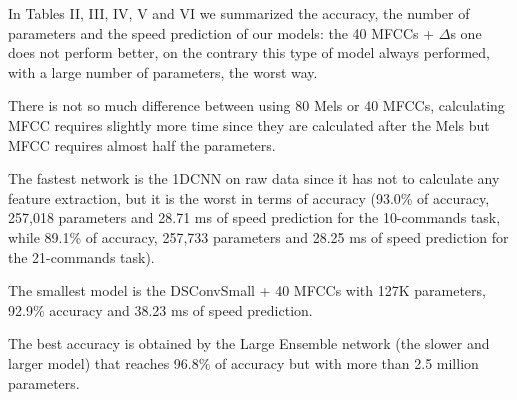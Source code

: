 \documentclass[conference]{IEEEtran}
\begin{document}
In Tables II, III, IV, V and VI we summarized the accuracy, the number of parameters and the speed prediction of our models: the 40 MFCCs + $\Delta$s one does not perform better, on the contrary this type of model always performed, with a large number of parameters, the worst way.

There is not so much difference between using 80 Mels or 40 MFCCs, calculating MFCC requires slightly more time since they are calculated after the Mels but MFCC requires almost half the parameters.

The fastest network is the 1DCNN on raw data since it has not to calculate any feature extraction, but it is the worst in terms of accuracy (93.0\% of accuracy, 257,018 parameters and 28.71 ms of speed prediction for the 10-commands task, while 89.1\% of accuracy, 257,733 parameters and 28.25 ms of speed prediction for the 21-commands task).

The smallest model is the DSConvSmall + 40 MFCCs with 127K parameters, 92.9\% accuracy and 38.23 ms of speed prediction.

The best accuracy is obtained by the Large Ensemble network (the slower and larger model) that reaches 96.8\% of accuracy but with more than 2.5 million parameters.

\begin{center}
\begin{table}[]
\begin{center}
\caption{1DCNN performances on 10 and 21-commands datasets.}
\end{center}
\end{table}
\end{center}
\end{document}
